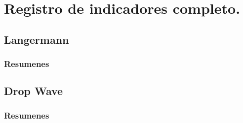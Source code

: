 \chapter{Registro de indicadores completo.}

\section{Langermann}

\subsection{Resumenes}











\section{Drop Wave}

\subsection{Resumenes}












